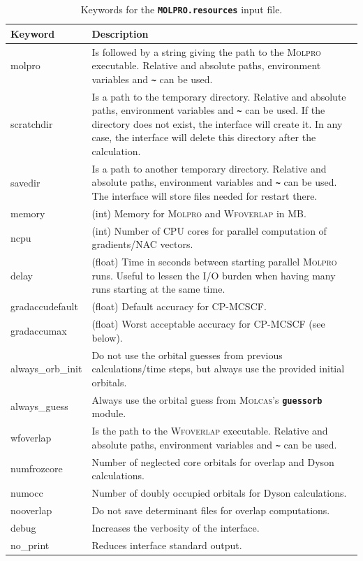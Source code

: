 \documentclass[a4paper,10pt,DIV=15,openany,twoside=false]{scrbook}
\newcommand{\ttt}[1]{\textbf{\texttt{#1}}}
\begin{document}
\begin{table}[t]
  \centering
  \caption{Keywords for the \ttt{MOLPRO.resources} input file.}
  \label{tab:molpro_sh2}
  \begin{tabular}{>{\ttfamily}lp{12cm}}
  \toprule
  Keyword       &Description\\
  \midrule
  molpro          &Is followed by a string giving the path to the \textsc{Molpro} executable. Relative and absolute paths, environment variables and \ttt{\textasciitilde} can be used. \\
  scratchdir      &Is a path to the temporary directory. Relative and absolute paths, environment variables and \ttt{\textasciitilde} can be used. If the directory does not exist, the interface will create it. In any case, the interface will delete this directory after the calculation.\\
  savedir         &Is a path to another temporary directory.  Relative and absolute paths, environment variables and \ttt{\textasciitilde} can be used. The interface will store files needed for restart there.\\
  memory        &(int) Memory for \textsc{Molpro} and \textsc{Wfoverlap} in MB.\\
  ncpu          &(int) Number of CPU cores for parallel computation of gradients/NAC vectors.\\
  delay         &(float) Time in seconds between starting parallel \textsc{Molpro} runs. Useful to lessen the I/O burden when having many runs starting at the same time.\\
  gradaccudefault &(float) Default accuracy for CP-MCSCF.\\
  gradaccumax     &(float) Worst acceptable accuracy for CP-MCSCF (see below).\\
  always\_orb\_init &Do not use the orbital guesses from previous calculations/time steps, but always use the provided initial orbitals.\\
  always\_guess   &Always use the orbital guess from \textsc{Molcas}'s \ttt{guessorb} module.\\
  wfoverlap       &Is the path to the \textsc{Wfoverlap} executable. Relative and absolute paths, environment variables and \ttt{\textasciitilde} can be used.\\
  numfrozcore           &Number of neglected core orbitals for overlap and Dyson calculations.\\
  numocc           &Number of doubly occupied orbitals for Dyson calculations.\\
  nooverlap       &Do not save determinant files for overlap computations.\\
  debug           &Increases the verbosity of the interface.\\
  no\_print       &Reduces interface standard output.\\
  \bottomrule
  \end{tabular}
\end{table}
\end{document}

